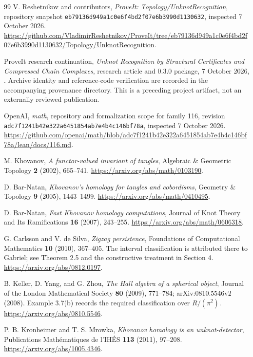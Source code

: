 \begin{thebibliography}{99}
V. Reshetnikov and contributors,
\emph{ProveIt: Topology/UnknotRecognition}, repository snapshot
\nolinkurl{eb79136d949a1c0e6f4bd2f07e6b3990d1130632}, inspected 7 October 2026.
\url{https://github.com/VladimirReshetnikov/ProveIt/tree/eb79136d949a1c0e6f4bd2f07e6b3990d1130632/Topology/UnknotRecognition}.

ProveIt research continuation,
\emph{Unknot Recognition by Structural Certificates and Compressed Chain
Complexes}, research article and  0.3.0 package,
7 October 2026, .
Archive identity and reference-code verification are recorded in the
accompanying provenance directory. This is a preceding project artifact,
not an externally reviewed publication.

OpenAI, \emph{math}, repository and formalization scope for family 116,
revision \nolinkurl{adc7f1241b42e322a6451854ab7e4b4c146bf78a}, inspected
7 October 2026.
\url{https://github.com/openai/math/blob/adc7f1241b42e322a6451854ab7e4b4c146bf78a/lean/docs/116.md}.

M. Khovanov, \emph{A functor-valued invariant of tangles},
Algebraic \& Geometric Topology \textbf{2} (2002), 665--741.
\url{https://arxiv.org/abs/math/0103190}.

D. Bar-Natan, \emph{Khovanov's homology for tangles and cobordisms},
Geometry \& Topology \textbf{9} (2005), 1443--1499.
\url{https://arxiv.org/abs/math/0410495}.

D. Bar-Natan, \emph{Fast Khovanov homology computations},
Journal of Knot Theory and Its Ramifications \textbf{16} (2007), 243--255.
\url{https://arxiv.org/abs/math/0606318}.

G. Carlsson and V. de Silva, \emph{Zigzag persistence},
Foundations of Computational Mathematics \textbf{10} (2010), 367--405.
The interval classification is attributed there to Gabriel; see Theorem 2.5
and the constructive treatment in Section 4.
\url{https://arxiv.org/abs/0812.0197}.

B. Keller, D. Yang, and G. Zhou,
\emph{The Hall algebra of a spherical object},
Journal of the London Mathematical Society \textbf{80} (2009), 771--784;
arXiv:0810.5546v2 (2008).
Example 3.7(b) records the required classification over $R/(\pi^2)$.
\url{https://arxiv.org/abs/0810.5546}.

P. B. Kronheimer and T. S. Mrowka,
\emph{Khovanov homology is an unknot-detector},
Publications Math\'ematiques de l'IH\'ES \textbf{113} (2011), 97--208.
\url{https://arxiv.org/abs/1005.4346}.


\end{thebibliography}
